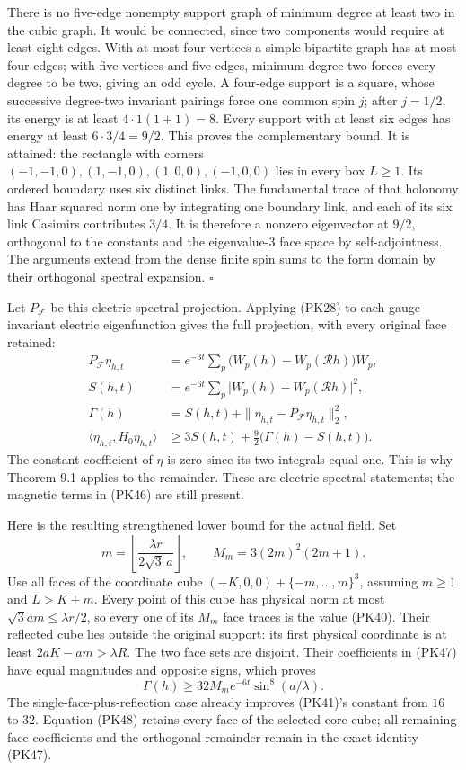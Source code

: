 \documentclass[11pt]{article}
\begin{document}
There is no five-edge nonempty support graph of minimum degree at least
two in the cubic graph. It would be connected, since two components would
require at least eight edges. With at most four vertices a simple bipartite
graph has at most four edges; with five vertices and five edges, minimum
degree two forces every degree to be two, giving an odd cycle. A four-edge
support is a square, whose successive degree-two invariant pairings force
one common spin \(j\); after \(j=1/2\), its energy is at least
\(4\cdot1(1+1)=8\). Every support with at least six edges has energy at
least \(6\cdot3/4=9/2\). This proves the complementary bound. It is
attained: the rectangle with corners
\((-1,-1,0),(1,-1,0),(1,0,0),(-1,0,0)\) lies in every box \(L\ge1\).
Its ordered boundary uses six distinct links. The fundamental trace of
that holonomy has Haar squared norm one by integrating one boundary link,
and each of its six link Casimirs contributes \(3/4\). It is therefore a
nonzero eigenvector at \(9/2\), orthogonal to the constants and the
eigenvalue-\(3\) face space by self-adjointness. The arguments
extend from the dense finite spin sums to the form domain by their
orthogonal spectral expansion. \(\square\)

Let \(P_{\mathcal F}\) be this electric spectral projection. Applying
(PK28) to each gauge-invariant electric eigenfunction gives the full
projection, with every original face retained:
\[
 \begin{aligned}
 P_{\mathcal F}\eta_{h,t}
 &=e^{-3t}\sum_p\bigl(W_p(h)-W_p(\mathcal Rh)\bigr)W_p,\\
 S(h,t)&=e^{-6t}\sum_p\bigl|W_p(h)-W_p(\mathcal Rh)\bigr|^2,\\
 \Gamma(h)&=S(h,t)+\|\eta_{h,t}-P_{\mathcal F}\eta_{h,t}\|_2^2,\\
 \langle\eta_{h,t},H_0\eta_{h,t}\rangle
 &\ge3S(h,t)+\frac92\bigl(\Gamma(h)-S(h,t)\bigr).
 \end{aligned}\tag{PK47}
\]
The constant coefficient of \(\eta\) is zero since its two integrals equal
one. This is why Theorem 9.1 applies to the remainder. These are electric
spectral statements; the magnetic terms in (PK46) are still present.

Here is the resulting strengthened lower bound for the actual field.
Set
\[
 m=\left\lfloor\frac{\lambda r}{2\sqrt3\,a}\right\rfloor,\qquad
 M_m=3(2m)^2(2m+1).
\]
Use all faces of the coordinate cube
\((-K,0,0)+\{-m,\ldots,m\}^3\), assuming \(m\ge1\) and
\(L>K+m\). Every point of this cube has physical norm at most
\(\sqrt3am\le\lambda r/2\), so every one of its \(M_m\) face traces is
the value (PK40). Their reflected cube lies outside the original support:
its first physical coordinate is at least \(2aK-am>\lambda R\).
The two face sets are disjoint. Their coefficients in (PK47) have equal
magnitudes and opposite signs, which proves
\[
 \Gamma(h)\ge32M_m e^{-6t}\sin^8(a/\lambda).
 \tag{PK48}
\]
The single-face-plus-reflection case already improves (PK41)'s constant
from \(16\) to \(32\). Equation (PK48) retains every face of the selected
core cube; all remaining face coefficients and the orthogonal remainder
remain in the exact identity (PK47).
\end{document}

